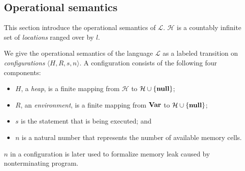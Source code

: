 
\subsection{Operational semantics}
\label{sec:languageSemantics}

This section introduce the operational semantics of \(\mathcal{L}\).
\(\mathcal{H}\) is a countably infinite set of \emph{locations} ranged
over by \(l\).

We give the operational semantics of the language \(\mathcal{L}\) as a
labeled transition on \emph{configurations} \(\langle H, R, s, n
\rangle\).  A configuration consists of the following four components:
\begin{itemize}
\item \(H\), a \emph{heap}, is a finite mapping from \(\mathcal{H}\)
  to \(\mathcal{H} \cup \{\mathbf{null}\}\);
\item \(R\), an \emph{environment}, is a finite mapping from \(\mathbf{Var}\)
  to \(\mathcal{H} \cup \{\mathbf{null}\}\);
\item \(s\) is the statement that is being executed; and
\item \(n\) is a natural number that represents the number of
  available memory cells.
\end{itemize}
\(n\) in a configuration is later used to formalize memory leak caused
by nonterminating program.

